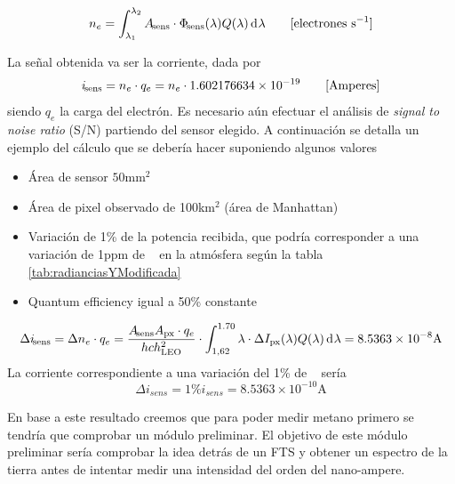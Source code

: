 \documentclass[11pt,titlepage]{article}
\begin{document}
\begin{equation}
    n_e = \int_{\lambda_1}^{\lambda_2} A_\sensor \cdot\Phi_\sensor(\lambda) Q(\lambda) \diff \lambda  \qquad [\text{electrones  s}^{-1}]
\end{equation}

La señal obtenida va ser la corriente, dada por
\[
i_{{\! \mathrm{\footnotesize sens}}} = n_e\cdot q_e = n_e \cdot 1.602176634\times10^{-19} \qquad [\text{Amperes}]
\]
siendo $q_e$ la carga del electrón.
Es necesario aún efectuar el análisis de \textit{signal to noise ratio} (S/N) partiendo del sensor elegido. A continuación se detalla un ejemplo del cálculo que se debería hacer suponiendo algunos valores

\begin{itemize}
    \item Área de sensor $50$mm$^2$
    \item Área de pixel observado de 100km$^2$ (área de Manhattan)
    \item Variación de 1\% de la potencia recibida, que podría corresponder a una variación de 1ppm de \metano~ en la atmósfera según la tabla \ref{tab:radianciasYModificada}
    \item Quantum efficiency igual a 50\% constante
\end{itemize}

\[
\Delta i_\sensor = \Delta n_e \cdot q_e = \frac{A_\sensor A_\px \cdot q_e}{h c  h_\LEO^2 } \cdot \int_{1,62}^{1.70} \lambda \cdot\Delta \pixrad(\lambda) Q(\lambda) \diff \lambda = 8.5363\times 10^{-8} \text{A}
\]
La corriente correspondiente a una variación del 1\% de \metano~ sería
\begin{equation}
    \Delta i_{sens}= 1\% i_{sens}= 8.5363\times 10^{-10} \text{A}
\end{equation}

En base a este resultado creemos que para poder medir metano primero se tendría que comprobar un módulo preliminar. El objetivo de este módulo preliminar sería comprobar la idea detrás de un FTS y obtener un espectro de la tierra antes de intentar medir una intensidad del orden del nano-ampere.


\end{document}
